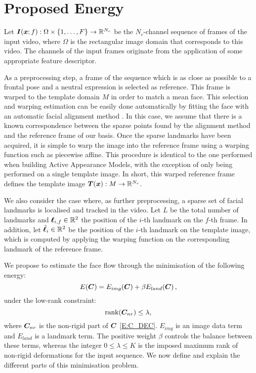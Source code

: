 \section{Proposed Energy}
Let $\boldsymbol{I}(\boldsymbol{x};f):\Omega\times \{1,\ldots,F\} \rightarrow \mathbb{R}^{N_c}$ be the
$N_c$-channel sequence of frames of the input video, where $\Omega$ is the
rectangular image domain that corresponds to this video. The channels of the
input frames originate from the application of some appropriate feature descriptor.

As a preprocessing step, a frame of the sequence which is as close as possible to
a frontal pose and a neutral expression is selected as reference. This frame is
warped to the template domain $M$ in order to match a mean face. This selection
and warping estimation can be easily done automatically by fitting the face
with an automatic facial alignment method \cite{kazemi2014one,RefWorks:227}. In this 
case, we assume that there is a known correspondence between the sparse points
found by the alignment method and the reference frame of our basis. Once the
sparse landmarks have been acquired, it is simple to warp the image into the
reference frame using a warping function such as piecewise affine. This
procedure is identical to the one performed when building Active Appearance
Models, with the exception of only being performed on a single template image.
In short, this warped reference frame defines the template image 
$\boldsymbol{T}(\boldsymbol{x}):M \rightarrow \mathbb{R}^{N_c}$.

We also consider the case where, as further preprocessing, a sparse set of facial
landmarks is localised and tracked in the video. Let $L$ be the total number of
landmarks and $\boldsymbol{\ell}_{i,f}\in\mathbb{R}^2$ the position of the $i$-th landmark on the
$f$-th frame. In addition, let $\hat{\boldsymbol{\ell}}_i\in\mathbb{R}^2$ be the position of the
$i$-th landmark on the template image, which is computed by applying the warping
function on the corresponding landmark of the reference frame.

We propose to estimate the face flow through the minimisation of the following energy:
\begin{equation}
    E(\boldsymbol{C}) = E_{img}(\boldsymbol{C}) + \beta E_{land}(\boldsymbol{C}) \,,
\end{equation}
under the low-rank constraint:
\begin{equation}\label{eq:lowrank}
    \mbox{rank}(\boldsymbol{C}_{nr}) \leq \lambda,
\end{equation}
where $\boldsymbol{C}_{nr}$ is the non-rigid part of $\boldsymbol{C}$ \eqref{E:C_DEC}. 
$E_{img}$ is an image data 
term and $E_{land}$ is a landmark term. The positive weight $\beta$ 
controls the balance between these terms, whereas the integer $0\leq\lambda\leq K$ is the 
imposed maximum rank of non-rigid deformations for the input sequence. 
We now define and explain the different parts of this minimisation problem.

